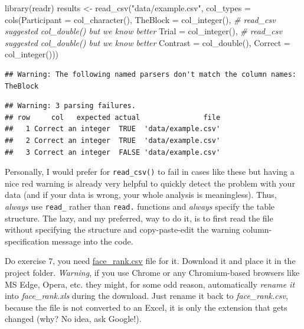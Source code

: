 \documentclass[
]{book}
\newenvironment{Shaded}{\begin{snugshade}}{\end{snugshade}}
\newcommand{\AttributeTok}[1]{\textcolor[rgb]{0.77,0.63,0.00}{#1}}
\newcommand{\CommentTok}[1]{\textcolor[rgb]{0.56,0.35,0.01}{\textit{#1}}}
\newcommand{\FunctionTok}[1]{\textcolor[rgb]{0.00,0.00,0.00}{#1}}
\newcommand{\NormalTok}[1]{#1}
\newcommand{\OtherTok}[1]{\textcolor[rgb]{0.56,0.35,0.01}{#1}}
\newcommand{\StringTok}[1]{\textcolor[rgb]{0.31,0.60,0.02}{#1}}
\begin{document}
\begin{Shaded}
\begin{Highlighting}[]
\FunctionTok{library}\NormalTok{(readr)}
\NormalTok{results }\OtherTok{\textless{}{-}} \FunctionTok{read\_csv}\NormalTok{(}\StringTok{"data/example.csv"}\NormalTok{, }
                    \AttributeTok{col\_types =} \FunctionTok{cols}\NormalTok{(}\AttributeTok{Participant =} \FunctionTok{col\_character}\NormalTok{(),}
                                     \AttributeTok{TheBlock =} \FunctionTok{col\_integer}\NormalTok{(), }\CommentTok{\# read\_csv suggested col\_double() but we know better}
                                     \AttributeTok{Trial =} \FunctionTok{col\_integer}\NormalTok{(), }\CommentTok{\# read\_csv suggested col\_double() but we know better}
                                     \AttributeTok{Contrast =} \FunctionTok{col\_double}\NormalTok{(),}
                                     \AttributeTok{Correct =} \FunctionTok{col\_integer}\NormalTok{()))}
\end{Highlighting}
\end{Shaded}

\begin{verbatim}
## Warning: The following named parsers don't match the column names: TheBlock
\end{verbatim}

\begin{verbatim}
## Warning: 3 parsing failures.
## row     col   expected actual               file
##   1 Correct an integer  TRUE  'data/example.csv'
##   2 Correct an integer  TRUE  'data/example.csv'
##   3 Correct an integer  FALSE 'data/example.csv'
\end{verbatim}

Personally, I would prefer for \texttt{read\_csv()} to fail in cases like these but having a nice red warning is already very helpful to quickly detect the problem with your data (and if your data is wrong, your whole analysis is meaningless). Thus, \emph{always} use \texttt{read\_} rather than \texttt{read.} functions and \emph{always} specify the table structure. The lazy, and my preferred, way to do it, is to first read the file without specifying the structure and copy-paste-edit the warning column-specification message into the code.

Do exercise 7, you need \href{data/face_rank.csv}{face\_rank.csv} file for it. Download it and place it in the project folder. \emph{Warning}, if you use Chrome or any Chromium-based browsers like MS Edge, Opera, etc. they might, for some odd reason, automatically \emph{rename it} into \emph{face\_rank.xls} during the download. Just rename it back to \emph{face\_rank.csv}, because the file is not converted to an Excel, it is only the extension that gets changed (why? No idea, ask Google!).
\end{document}
